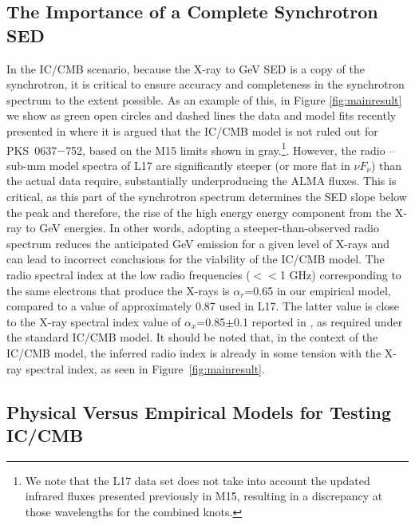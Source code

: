 \documentclass[twocolumn]{aastex61}
\begin{document}
\subsection{The Importance of a Complete Synchrotron SED \label{importanceofSED}}
In the IC/CMB scenario, because the X-ray to GeV SED is a copy of the
synchrotron, it is critical to ensure accuracy and completeness in the
synchrotron spectrum to the extent possible. As an example of this, in
Figure \ref{fig:mainresult} we show as green open circles and dashed
lines the data and model fits recently presented in \citet[][hereafter
  {L17}]{lucchini2016} where it is argued that the IC/CMB model is not
ruled out for PKS~0637$-$752, based on the M15 limits shown in
gray.\footnote{We note that the L17 data set does not take into
  account the updated infrared fluxes presented previously in M15,
  resulting in a discrepancy at those wavelengths for the combined
  knots.}. However, the radio -- sub-mm model spectra of L17 are
significantly steeper (or more flat in $\nu F_\nu$) than the actual
data require, substantially underproducing the ALMA fluxes. This is
critical, as this part of the synchrotron spectrum determines the SED
slope below the peak and therefore, the rise of the high energy energy
component from the X-ray to GeV energies. In other words, adopting a
steeper-than-observed radio spectrum reduces the anticipated GeV
emission for a given level of X-rays and can lead to incorrect
conclusions for the viability of the IC/CMB model. The radio spectral
index at the low radio frequencies ($<<$1 GHz) corresponding to the
same electrons that produce the X-rays is $\alpha_r$=0.65 in our
empirical model, compared to a value of approximately 0.87 used in
L17. The latter value is close to the X-ray spectral index value of
$\alpha_x$=0.85$\pm$0.1 reported in \cite{chartas2000}, as required
under the standard IC/CMB model. It should be noted that, in the
context of the IC/CMB model, the inferred radio index is already in
some tension with the X-ray spectral index, as seen in
Figure~\ref{fig:mainresult}.



\subsection{Physical Versus Empirical Models for Testing IC/CMB \label{numerical}}
\end{document}
